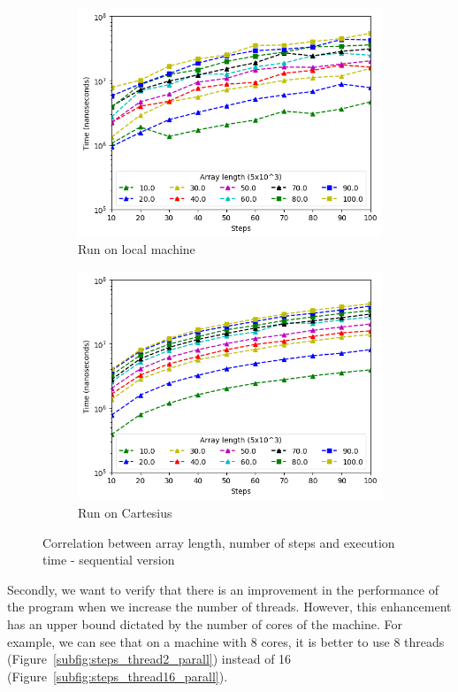 \documentclass[a4paper]{article}
\begin{document}
\begin{figure}[htbp]
\begin{subfigure}{.45\textwidth}
  \includegraphics[width=\linewidth]{res/seq/array_steps_res_seq.png}
  \caption{Run on local machine}
  \label{subfig:steps_seq}
\end{subfigure}%
\begin{subfigure}{.45\textwidth}
  \centering
  \includegraphics[width=\linewidth]{res/seq/array_steps_res_seq_cartesius.png}
  \caption{Run on Cartesius}
  \label{subfig:steps_seq_cart}
\end{subfigure}
\caption{Correlation between array length, number of steps and execution time - sequential version}
\label{fig:seq}
\end{figure}

Secondly, we want to verify that there is an improvement in the performance of the program when we increase the number of threads. However, this enhancement has an upper bound dictated by the number of cores of the machine. For example, we can see that on a machine with 8 cores, it is better to use 8 threads (Figure~\ref{subfig:steps_thread2_parall}) instead of 16 (Figure~\ref{subfig:steps_thread16_parall}).
\end{document}
